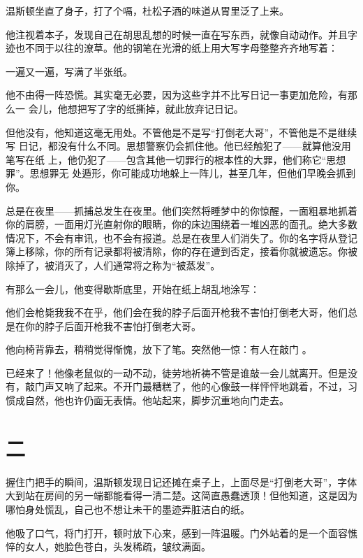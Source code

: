 温斯顿坐直了身子，打了个嗝，杜松子酒的味道从胃里泛了上来。

他注视着本子，发现自己在胡思乱想的时候一直在写东西，就像自动动作。并且字迹也不同于以往的潦草。他的钢笔在光滑的纸上用大写字母整整齐齐地写着：


一遍又一遍，写满了半张纸。

他不由得一阵恐慌。其实毫无必要，因为这些字并不比写日记一事更加危险，有那么一
会儿，他想把写了字的纸撕掉，就此放弃记日记。

但他没有，他知道这毫无用处。不管他是不是写``打倒老大哥''，不管他是不是继续写
日记，都没有什么不同。思想警察仍会抓住他。他已经触犯了——就算他没用笔写在纸
上，他仍犯了——包含其他一切罪行的根本性的大罪，他们称它``思想罪''。思想罪无
处遁形，你可能成功地躲上一阵儿，甚至几年，但他们早晚会抓到你。

总是在夜里——抓捕总发生在夜里。他们突然将睡梦中的你惊醒，一面粗暴地抓着你的肩膀，一面用灯光直射你的眼睛，你的床边围绕着一堆凶恶的面孔。绝大多数情况下，不会有审讯，也不会有报道。总是在夜里人们消失了。你的名字将从登记簿上移除，你的所有记录都将被清除，你的存在遭到否定，接着你就被遗忘。你被除掉了，被消灭了，人们通常将之称为``被蒸发''。

有那么一会儿，他变得歇斯底里，开始在纸上胡乱地涂写：

他们会枪毙我我不在乎，他们会在我的脖子后面开枪我不害怕打倒老大哥，他们总是在你的脖子后面开枪我不害怕打倒老大哥。

他向椅背靠去，稍稍觉得惭愧，放下了笔。突然他一惊：有人在敲门 。

已经来了！他像老鼠似的一动不动，徒劳地祈祷不管是谁敲一会儿就离开。但是没有，敲门声又响了起来。不开门最糟糕了，他的心像鼓一样怦怦地跳着，不过，习惯成自然，他也许仍面无表情。他站起来，脚步沉重地向门走去。

\section*{二}\label{ux4e8c}

握住门把手的瞬间，温斯顿发现日记还摊在桌子上，上面尽是``打倒老大哥''，字体大到站在房间的另一端都能看得一清二楚。这简直愚蠢透顶！但他知道，这是因为哪怕身处慌乱，自己也不想让未干的墨迹弄脏洁白的纸。

他吸了口气，将门打开，顿时放下心来，感到一阵温暖。门外站着的是一个面容憔悴的女人，她脸色苍白，头发稀疏，皱纹满面。

